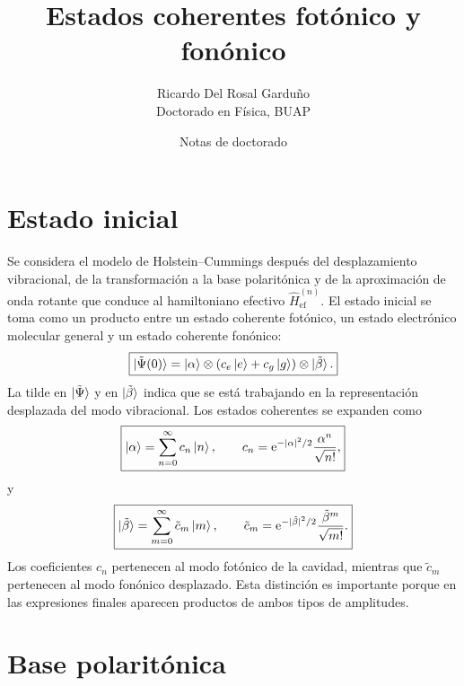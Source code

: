 \documentclass[11pt]{article}
\title{Estados coherentes fot\'onico y fon\'onico}
\author{Ricardo Del Rosal Gardu\~no \\ \small Doctorado en F\'isica, BUAP}
\date{Notas de doctorado}
\newcommand{\ee}{\mathrm{e}}
\begin{document}
\maketitle
\tableofcontents
\bigskip

\section{Estado inicial}

Se considera el modelo de Holstein--Cummings despu\'es del desplazamiento
vibracional, de la transformaci\'on a la base polarit\'onica y de la
aproximaci\'on de onda rotante que conduce al hamiltoniano efectivo
$\hat H_{\mathrm{ef}}^{(n)}$. El estado inicial se toma como un producto entre
un estado coherente fot\'onico, un estado electr\'onico molecular general y un
estado coherente fon\'onico:
\begin{equation}
  \boxed{
  \ket{\tilde\Psi(0)}
  =
  \ket{\alpha}
  \otimes
  (c_e\ket e+c_g\ket g)
  \otimes
  \ket{\tilde\beta}.
  }
\end{equation}
La tilde en $\ket{\tilde\Psi}$ y en $\ket{\tilde\beta}$ indica que se est\'a
trabajando en la representaci\'on desplazada del modo vibracional. Los estados
coherentes se expanden como
\begin{equation}
  \boxed{
  \ket{\alpha}
  =
  \sum_{n=0}^{\infty}c_n\ket n,
  \qquad
  c_n
  =
  \ee^{-|\alpha|^2/2}
  \frac{\alpha^n}{\sqrt{n!}},
  }
\end{equation}
y
\begin{equation}
  \boxed{
  \ket{\tilde\beta}
  =
  \sum_{m=0}^{\infty}\tilde c_m\ket m,
  \qquad
  \tilde c_m
  =
  \ee^{-|\tilde\beta|^2/2}
  \frac{\tilde\beta^m}{\sqrt{m!}}.
  }
\end{equation}
Los coeficientes $c_n$ pertenecen al modo fot\'onico de la cavidad, mientras
que $\tilde c_m$ pertenecen al modo fon\'onico desplazado. Esta distinci\'on es
importante porque en las expresiones finales aparecen productos de ambos tipos
de amplitudes.

\section{Base polarit\'onica}
\end{document}
